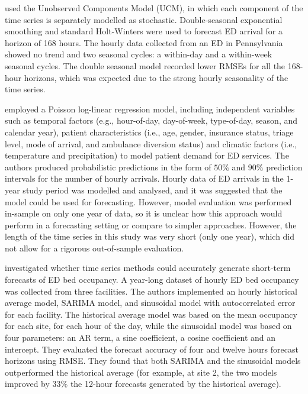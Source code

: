 \documentclass[]{elsarticle} %
\begin{document}
\citet{morzuch2006forecasting} used the Unobserved Components Model (UCM), in
which each component of the time series is separately modelled as
stochastic. Double-seasonal exponential smoothing and standard
Holt-Winters were used to forecast ED arrival for a horizon of 168
hours. The hourly data collected from an ED in Pennsylvania showed no
trend and two seasonal cycles: a within-day and a within-week seasonal
cycles. The double seasonal model recorded lower RMSEs for all the 168-hour horizons, which was expected due to the strong hourly
seasonality of the time series.

\citet{mccarthy2008challenge} employed a Poisson log-linear regression model,
including independent variables such as temporal factors (e.g.,
hour-of-day, day-of-week, type-of-day, season, and calendar year),
patient characteristics (i.e., age, gender, insurance status, triage
level, mode of arrival, and ambulance diversion status) and climatic
factors (i.e., temperature and precipitation) to model patient demand
for ED services. The authors produced probabilistic predictions in the
form of \(50\%\) and \(90\%\) prediction intervals for the number of hourly
arrivals. Hourly data of ED arrivals in the 1-year study period was
modelled and analysed, and it was suggested that the model could be used
for forecasting. However, model evaluation was performed in-sample on
only one year of data, so it is unclear how this approach would perform
in a forecasting setting or compare to simpler approaches. However, the
length of the time series in this study was very short (only one year),
which did not allow for a rigorous out-of-sample evaluation.

\citet{schweigler2009forecasting} investigated whether time series methods
could accurately generate short-term forecasts of ED bed occupancy. A
year-long dataset of hourly ED bed occupancy was collected from three
facilities. The authors implemented an hourly historical average model,
SARIMA model, and sinusoidal model with autocorrelated error for each
facility. The historical average model was based on the mean occupancy
for each site, for each hour of the day, while the sinusoidal model was
based on four parameters: an AR term, a sine coefficient, a cosine
coefficient and an intercept. They evaluated the forecast accuracy of
four and twelve hours forecast horizons using RMSE. They found that both
SARIMA and the sinusoidal models outperformed the historical average
(for example, at site 2, the two models improved by \(33\%\) the 12-hour
forecasts generated by the historical average).
\end{document}
